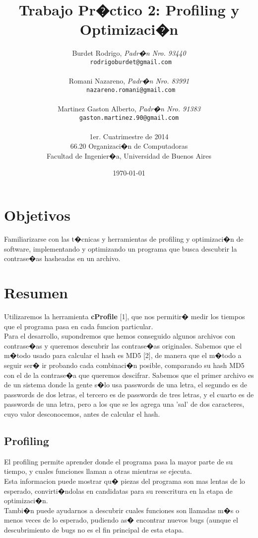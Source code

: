 \documentclass[a4paper,10pt,oneside]{article}
\title{\textbf{Trabajo Pr�ctico 2: Profiling y Optimizaci�n}}
\author{    Burdet Rodrigo, \textit{Padr�n Nro. 93440}\\
            \texttt{ rodrigoburdet@gmail.com}\\\\
            Romani Nazareno, \textit{Padr�n Nro. 83991}                     \\
            \texttt{ nazareno.romani@gmail.com}\\\\
            Martinez Gaston Alberto, \textit{Padr�n Nro. 91383}                     \\
            \texttt{ gaston.martinez.90@gmail.com }\\\\[2.5ex]
            \normalsize{1er. Cuatrimestre de 2014}                       \\
            \normalsize66.20 Organizaci�n de Computadoras\\
            \normalsize{Facultad de Ingenier�a, Universidad de Buenos Aires}            \\
       }
\date{\today}
\begin{document}
\maketitle

\thispagestyle{empty}

\newpage

\section{Objetivos}
	Familiarizarse con las t�cnicas y herramientas de profiling y optimizaci�n de
software, implementando y optimizando un programa que busca descubrir
la contrase�as hasheadas en un archivo.

\section{Resumen}
Utilizaremos la herramienta \textbf{cProfile} [1], que nos permitir� medir los tiempos que el programa pasa en cada funcion particular.\\
Para el desarrollo, supondremos que hemos conseguido algunos archivos con contrase�as y queremos descubrir las contrase�as originales. Sabemos que el m�todo usado para calcular el hash es MD5 [2], de manera que el m�todo a seguir ser� ir probando cada combinaci�n posible, comparando su hash MD5 con el de la contrase�a que queremos descifrar. Sabemos que el primer archivo es de un sistema donde la gente s�lo usa passwords de una
letra, el segundo es de passwords de dos letras, el tercero es de passwords de tres letras, y el cuarto es de passwords de una letra, pero a los que se les agrega una 'sal' de dos caracteres, cuyo valor desconocemos, antes de calcular el hash.
	
\subsection{Profiling}

El profiling permite aprender donde el programa pasa la mayor parte de su tiempo, y cuales funciones llaman a otras mientras se ejecuta.\\
 	Esta informacion puede mostrar qu� piezas del programa son mas lentas de lo esperado, convirti�ndolas en candidatas para su reescritura en la etapa de optimizaci�n.\\
 	Tambi�n puede ayudarnos a descubrir cuales funciones son llamadas m�s o menos veces de lo esperado, pudiendo as� encontrar nuevos bugs (aunque el descubrimiento de bugs no es el fin principal de esta etapa.
 			   
\end{document}
